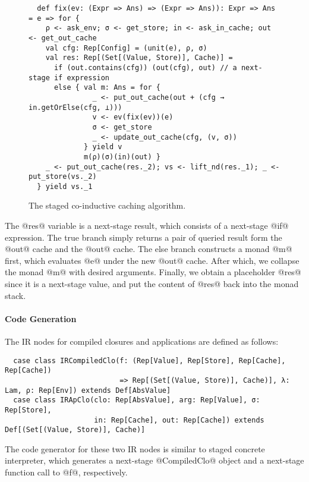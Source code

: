 \begin{figure}[h!]
  \centering
\begin{lstlisting}
  def fix(ev: (Expr => Ans) => (Expr => Ans)): Expr => Ans = e => for {
    ρ <- ask_env; σ <- get_store; in <- ask_in_cache; out <- get_out_cache
    val cfg: Rep[Config] = (unit(e), ρ, σ)
    val res: Rep[(Set[(Value, Store)], Cache)] =
      if (out.contains(cfg)) (out(cfg), out) // a next-stage if expression
      else { val m: Ans = for {
               _ <- put_out_cache(out + (cfg → in.getOrElse(cfg, ⊥)))
               v <- ev(fix(ev))(e)
               σ <- get_store
               _ <- update_out_cache(cfg, (v, σ))
             } yield v
             m(ρ)(σ)(in)(out) }
    _ <- put_out_cache(res._2); vs <- lift_nd(res._1); _ <- put_store(vs._2)
  } yield vs._1
\end{lstlisting}
\caption{The staged co-inductive caching algorithm.}
\label{fig:staged_coind_cache}
\end{figure}

The @res@ variable is a next-stage result, which consists of a next-stage @if@
expression. The true branch simply returns a pair of queried result form the
@out@ cache and the @out@ cache. The else branch constructs a monad @m@ first,
which evaluates @e@ under the new @out@ cache. After which, we collapse the
monad @m@ with desired arguments. Finally, we obtain a placeholder @res@ since
it is a next-stage value, and put the content of @res@ back into the monad
stack.

\paragraph{Code Generation} The IR nodes for compiled closures and
applications are defined as follows:

\begin{lstlisting}
  case class IRCompiledClo(f: (Rep[Value], Rep[Store], Rep[Cache], Rep[Cache])
                           => Rep[(Set[(Value, Store)], Cache)], λ: Lam, ρ: Rep[Env]) extends Def[AbsValue]
  case class IRApClo(clo: Rep[AbsValue], arg: Rep[Value], σ: Rep[Store],
                     in: Rep[Cache], out: Rep[Cache]) extends Def[(Set[(Value, Store)], Cache)]
\end{lstlisting}

The code generator for these two IR nodes is similar to staged concrete
interpreter, which generates a next-stage @CompiledClo@ object and a next-stage
function call to @f@, respectively.
                   
